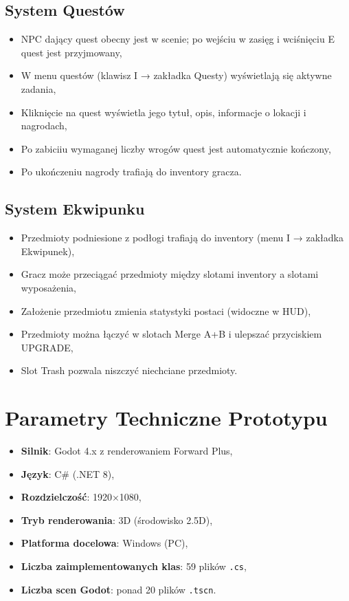 \subsection{System Questów}
\begin{itemize}
    \item NPC dający quest obecny jest w scenie; po wejściu w zasięg i wciśnięciu E quest jest przyjmowany,
    \item W menu questów (klawisz I → zakładka Questy) wyświetlają się aktywne zadania,
    \item Kliknięcie na quest wyświetla jego tytuł, opis, informacje o lokacji i nagrodach,
    \item Po zabiciiu wymaganej liczby wrogów quest jest automatycznie kończony,
    \item Po ukończeniu nagrody trafiają do inventory gracza.
\end{itemize}

\subsection{System Ekwipunku}
\begin{itemize}
    \item Przedmioty podniesione z podłogi trafiają do inventory (menu I → zakładka Ekwipunek),
    \item Gracz może przeciągać przedmioty między slotami inventory a slotami wyposażenia,
    \item Założenie przedmiotu zmienia statystyki postaci (widoczne w HUD),
    \item Przedmioty można łączyć w slotach Merge A+B i ulepszać przyciskiem UPGRADE,
    \item Slot Trash pozwala niszczyć niechciane przedmioty.
\end{itemize}

\section{Parametry Techniczne Prototypu}

\begin{itemize}
    \item \textbf{Silnik}: Godot 4.x z renderowaniem Forward Plus,
    \item \textbf{Język}: C\# (.NET 8),
    \item \textbf{Rozdzielczość}: 1920×1080,
    \item \textbf{Tryb renderowania}: 3D (środowisko 2.5D),
    \item \textbf{Platforma docelowa}: Windows (PC),
    \item \textbf{Liczba zaimplementowanych klas}: 59 plików \texttt{.cs},
    \item \textbf{Liczba scen Godot}: ponad 20 plików \texttt{.tscn}.
\end{itemize}

